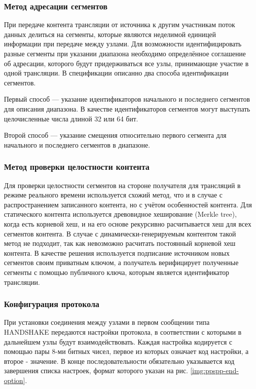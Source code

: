 		\subsubsection{Метод адресации сегментов}
		При передаче контента трансляции от источника к другим участникам поток данных делиться на сегменты, которые
		являются неделимой единицей информации при передаче между узлами. Для возможности идентифицировать разные
		сегменты при указании диапазона необходимо определённое соглашение об адресации, которого будут придерживаться
		все узлы, принимающие участие в одной трансляции. В спецификации описанно два способа идентификации сегментов.

		Первый способ --- указание идентификаторов начального и последнего сегментов для описания диапазона. В качестве
		идентификаторов сегментов могут выступать целочисленные числа длиной 32 или 64 бит.

		Второй способ --- указание смещения относительно первого сегмента для начального и последнего сегментов в
		диапазоне.

		\subsubsection{Метод проверки целостности контента}
		Для проверки целостности сегментов на стороне получателя для трансляций в режиме реального времени используется
		схожий метод, что и в случае с распространением записанного контента, но с учётом особенностей контента. Для
		статического контента используется древовидное хеширование (Merkle tree), когда есть корневой хеш, и на его
		основе рекурсивно расчитывается хеш для всех сегментов контента. В случае с динамически-генерируемым контентом
		такой метод не подходит, так как невозможно расчитать постоянный корневой хеш контента. В качестве решения
		используется подписание источником новых сегментов своим приватным ключом, а получатель верифицирует полученные
		сегменты с помощью публичного ключа, которым является идентификатор трансляции.

		\subsubsection{Конфигурация протокола}
		При установки соединения между узлами в первом сообщении типа HANDSHAKE передаются настройки протокола, в
		соответствии с которыми в дальнейшем узлы будут взаимодействовать. Каждая настройка кодируется с помощью пары
		8-ми битных чисел, первое из которых означает код настройки, а второе - значение. В конце последовательности
		обязательно указывается код завершения списка настроек, формат которого указан на рис.
		\ref{img:ppspp-end-option}.

